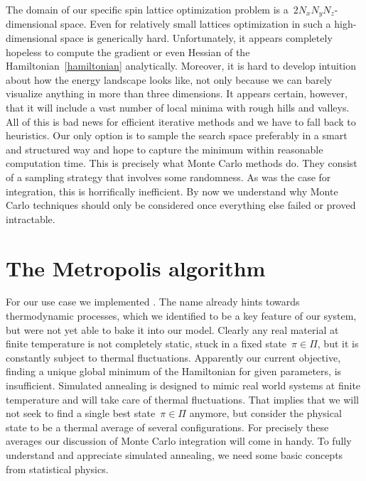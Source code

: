 The domain of our specific spin lattice optimization problem is a~$2 N_x N_y
N_z$-dimensional space.  Even for relatively small lattices optimization in such
a high-dimensional space is generically hard. Unfortunately, it appears
completely hopeless to compute the gradient or even Hessian of the
Hamiltonian~\eqref{hamiltonian} analytically. Moreover, it is hard to develop
intuition about how the energy landscape looks like, not only because we can
barely visualize anything in more than three dimensions. It appears certain,
however, that it will include a vast number of local minima with rough hills and
valleys. All of this is bad news for efficient iterative methods and we have to
fall back to heuristics. Our only option is to sample the search space
preferably in a smart and structured way and hope to capture the minimum within
reasonable computation time. This is precisely what Monte Carlo methods do. They
consist of a sampling strategy that involves some randomness. As was the case
for integration, this is horrifically inefficient. By now we understand why
Monte Carlo techniques should only be considered once everything else failed or
proved intractable.
%
\section{The Metropolis algorithm}\label{sec:metropolis}
%
For our use case we implemented . The name already
hints towards thermodynamic processes, which we identified to be a key
feature of our system, but were not yet able to bake it into our model. Clearly
any real material at finite temperature is not completely static, \ie{} stuck in
a fixed state~$\pi \in \Pi$, but it is constantly subject to thermal
fluctuations. Apparently our current objective, finding a unique global minimum
of the Hamiltonian for given parameters, is insufficient. Simulated annealing is
designed to mimic real world systems at finite temperature and will take care of
thermal fluctuations. That implies that we will not seek to find a single best
state~$\pi \in \Pi$ anymore, but consider the physical state to be a thermal
average of several configurations. For precisely these averages our discussion
of Monte Carlo integration will come in handy. To fully understand and
appreciate simulated annealing, we need some basic concepts from statistical
physics.

